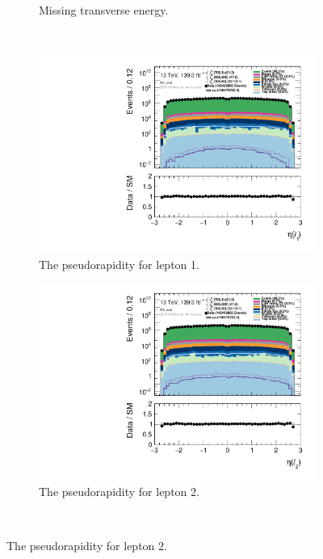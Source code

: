 \begin{figure}[H]
\begin{subfigure}[t!]{0.49\textwidth}
    \caption{Missing transverse energy.}
    \label{fig:my_label}
    \end{subfigure}
    \\
    \begin{subfigure}[t!]{0.49\textwidth}
        \includegraphics[width=\textwidth]{Figures/SlepSlep/CutAndCount/ML_cuts/hist1d_lepEta[0]_ML_cuts.pdf}
    \caption{The pseudorapidity for lepton 1.}
    \label{fig:my_label}
    \end{subfigure}
    \begin{subfigure}[t!]{0.49\textwidth}
        \includegraphics[width=\textwidth]{Figures/SlepSlep/CutAndCount/ML_cuts/hist1d_lepEta[1]_ML_cuts.pdf}
    \caption{The pseudorapidity for lepton 2.}
    \label{fig:my_label}
    \end{subfigure}
    \\

\end{figure}
